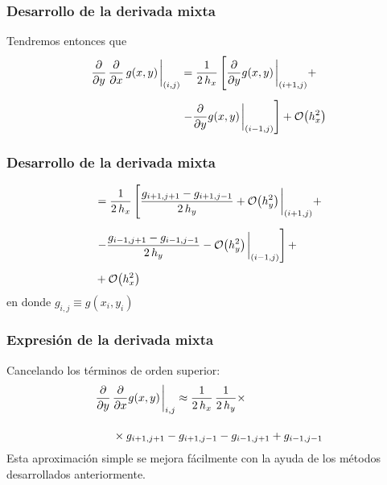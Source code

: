 \begin{frame}[fragile]
\frametitle{Desarrollo de la derivada mixta}
Tendremos entonces que
\begin{align*}
\pdv{y} \, \pdv{x} \, g(x, y) \eval_{(i,j)} &= \dfrac{1}{2 \, h_{x}} \left[ \pdv{y} g(x, y)\eval_{(i + 1, j)} + \right. \\[0.5em]
&\left. - \pdv{y} g(x, y)\eval_{(i-1, j)} \right] + \order{h_{x}^{2}}
\end{align*}
\end{frame}
\begin{frame}
\frametitle{Desarrollo de la derivada mixta}
\begin{align*}
&= \dfrac{1}{2 \, h_{x}} \left[ \dfrac{g_{i+1, j+1} - g_{i+1, j-1}}{2 \, h_{y}} + \order{h_{y}^{2}} \eval_{(i+1, j)} + \right. \\[0.5em]
&\left. - \dfrac{g_{i-1, j+1} - g_{i-1, j-1}}{2 \, h_{y}} - \order{h_{y}^{2}}\eval_{(i-1, j)}  \right] + \\[0.5em]
&+ \order{h_{x}^{2}}
\end{align*}
en donde $g_{i,j} \equiv g(x_{i}, y_{i})$
\end{frame}
\begin{frame}
\frametitle{Expresión de la derivada mixta}
Cancelando los términos de orden superior:
\begin{align*}
\pdv{y} \, &\pdv{x} g(x, y)\eval_{i ,j} \approx \dfrac{1}{2 \, h_{x}} \, \dfrac{1}{2 \, h_{y}} \times \\[1em]  
&\times g_{i+1, j+1} - g_{i+1, j-1} - g_{i-1, j+1} + g_{i-1, j-1}
\end{align*}
Esta aproximación simple se mejora fácilmente con la ayuda de los métodos desarrollados anteriormente.
\end{frame}
